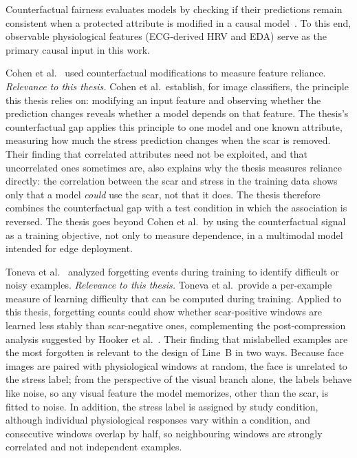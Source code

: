 Counterfactual fairness evaluates models by checking if their predictions remain consistent when a protected attribute is modified in a causal model~\cite{kusner2017}. To this end, observable physiological features (ECG-derived HRV and EDA) serve as the primary causal input in this work.

Cohen et al.~\cite{cohen2025} used counterfactual modifications to measure feature reliance.
\textit{Relevance to this thesis.} Cohen et al.\ establish, for image classifiers, the principle this thesis relies on: modifying an input feature and observing whether the prediction changes reveals whether a model depends on that feature. The thesis's counterfactual gap applies this principle to one model and one known attribute, measuring how much the stress prediction changes when the scar is removed. Their finding that correlated attributes need not be exploited, and that uncorrelated ones sometimes are, also explains why the thesis measures reliance directly: the correlation between the scar and stress in the training data shows only that a model \emph{could} use the scar, not that it does. The thesis therefore combines the counterfactual gap with a test condition in which the association is reversed. The thesis goes beyond Cohen et al.\ by using the counterfactual signal as a training objective, not only to measure dependence, in a multimodal model intended for edge deployment.

Toneva et al.~\cite{toneva2019} analyzed forgetting events during training to identify difficult or noisy examples.
\textit{Relevance to this thesis.} Toneva et al.\ provide a per-example measure of learning difficulty that can be computed during training. Applied to this thesis, forgetting counts could show whether scar-positive windows are learned less stably than scar-negative ones, complementing the post-compression analysis suggested by Hooker et al.~\cite{hooker2019}. Their finding that mislabelled examples are the most forgotten is relevant to the design of Line~B in two ways. Because face images are paired with physiological windows at random, the face is unrelated to the stress label; from the perspective of the visual branch alone, the labels behave like noise, so any visual feature the model memorizes, other than the scar, is fitted to noise. In addition, the stress label is assigned by study condition, although individual physiological responses vary within a condition, and consecutive windows overlap by half, so neighbouring windows are strongly correlated and not independent examples.

